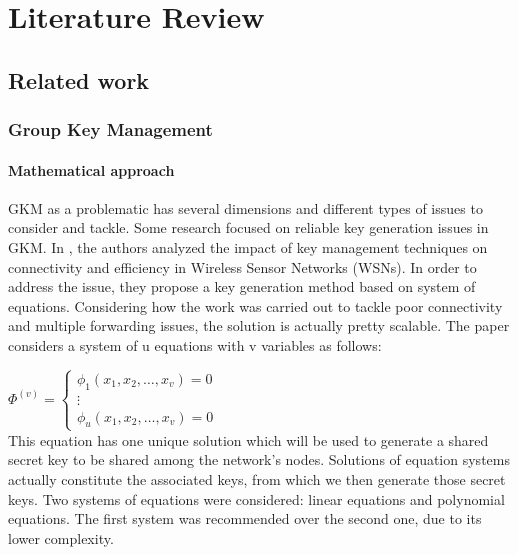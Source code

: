 \chapter{Literature Review}
\label{chap:litterature}

\section{Related work}

\subsection{Group Key Management}

\subsubsection{Mathematical approach}

GKM as a problematic has several dimensions and different types of issues to consider and tackle. Some research focused on reliable key generation issues in GKM. In \cite{zhan_novel_2017}, the authors analyzed the impact of key management techniques on connectivity and efficiency in Wireless Sensor Networks (WSNs). In order to address the issue, they propose a key generation method based on system of equations. Considering how the work was carried out to tackle poor connectivity and multiple forwarding issues, the solution is actually pretty scalable. The paper considers a system of u equations with v variables as follows:

\begin{math}
	\Phi^{\left(v\right)} =
	\left\{
	\begin{array}{l}
		\phi_1 \left(x_1, x_2, \ldots, x_v\right) = 0\\
		\vdots \\
		\phi_u \left(x_1, x_2, \ldots, x_v\right) = 0
	\end{array}
	\right.
\end{math}\\

This equation has one unique solution which will be used to generate a shared secret key to be shared among the network’s nodes. Solutions of equation systems actually constitute the associated keys, from which we then generate those secret keys. Two systems of equations were considered: linear equations and polynomial equations. The first system was recommended over the second one, due to its lower complexity.

